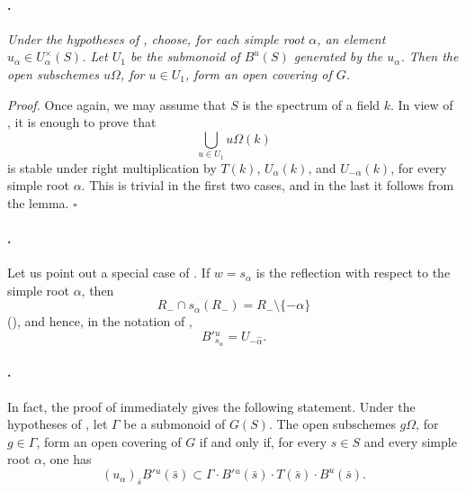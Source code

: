 \paragraph{.}
\textit{Under the hypotheses of , choose, for each simple
root \(\alpha\), an element
\(u_\alpha\in U_\alpha^\times(S)\). Let \(U_1\) be the submonoid of
\(B^u(S)\) generated by the \(u_\alpha\). Then the open subschemes
\(u\Omega\), for \(u\in U_1\), form an open covering of \(G\).}

\textit{Proof.}
Once again, we may assume that \(S\) is the spectrum of a field
\(k\). In view of , it is enough to prove that
\[
  \bigcup_{u\in U_1}u\Omega(k)
\]
is stable under right multiplication by \(T(k)\), \(U_\alpha(k)\),
and \(U_{-\alpha}(k)\), for every simple root \(\alpha\). This is
trivial in the first two cases, and in the last it follows from the
lemma.
\hfill\(\square\)

\paragraph{.}
Let us point out a special case of . If \(w=s_\alpha\) is the
reflection with respect to the simple root \(\alpha\), then
\[
  R_-\cap s_\alpha(R_-)=R_-\setminus\{-\alpha\}
\]
\textup{()}, and hence, in the notation of ,
\[
  B'{}^u_{s_\alpha}=U_{-\widehat\alpha}.
\]

\paragraph{.}
In fact, the proof of  immediately gives the following
statement. Under the hypotheses of , let \(\Gamma\) be a
submonoid of \(G(S)\). The open subschemes \(g\Omega\), for
\(g\in\Gamma\), form an open covering of \(G\) if and only if, for
every \(s\in S\) and every simple root \(\alpha\), one has
\[
  (u_\alpha)_{\bar{s}}B'{}^u(\bar{s})
  \subset
  \Gamma\cdot B'{}^u(\bar{s})\cdot T(\bar{s})\cdot B^u(\bar{s}).
\]

